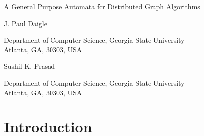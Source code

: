 \documentclass[twoside]{article}
\newcommand{\jtitle}{A General Purpose Automata for Distributed Graph Algorithms}
\begin{document}
\thispagestyle{empty}
\copyrightheader

\begin{center}
\jtitle

\vspace{20pt}

J. Paul Daigle 

\vspace{2pt}

Department of Computer Science, Georgia State University\\
Atlanta, GA, 30303, USA

\vspace{10pt}
%
\vspace{10pt}
Sushil K. Prasad

\vspace{2pt}
Department of Computer Science, Georgia State University\\
Atlanta, GA, 30303, USA

\vspace{10pt}
%
%

\vspace{20pt}

\end{center}


\begin{abstract}
We present an automata for a compute node in a message passing model which allows a distributed computer to approximate solutions for three NP-Complete graph problems. Our algorithm for the Vertex Cover Problem uses $O(\log{\Delta)}$ communication rounds to find a 2-approximate solution. Our edge coloring algorithm is also 2-approximate and resolves in $O(\Delta)$ rounds, and we find a correct strong edge coloring of a symmetric digraph in $O(\Delta)$ rounds. All three algorithms require only one hop information to find correct solutions. 
\end{abstract}


\section{Introduction}
\end{document}
